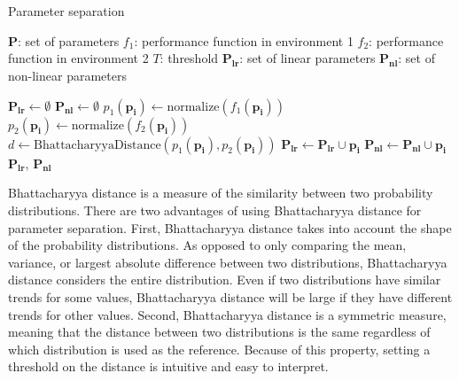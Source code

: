 \begin{algorithm}\small
  \caption{Parameter separation}
  \label{alg:separation}
  \begin{algorithmic}[1]
      \Require 
        \Statex $\boldsymbol{P}$: set of parameters
        \Statex $f_{1}$: performance function in environment 1
        \Statex $f_{2}$: performance function in environment 2
        \Statex $T$: threshold
      \Ensure 
        \Statex $\boldsymbol{P_{lr}}$: set of linear parameters
        \Statex $\boldsymbol{P_{nl}}$: set of non-linear parameters
      \Statex

      \State $\boldsymbol{P_{lr}} \gets \emptyset$
      \State $\boldsymbol{P_{nl}} \gets \emptyset$
          \State $p_{1}(\boldsymbol{p_i}) \gets \text{normalize}(f_{1}(\boldsymbol{p_i}))$\label{alg:separation:norm1}
          \State $p_{2}(\boldsymbol{p_i}) \gets \text{normalize}(f_{2}(\boldsymbol{p_i}))$\label{alg:separation:norm2}
          \State $d \gets \text{BhattacharyyaDistance}(p_{1}(\boldsymbol{p_i}), p_{2}(\boldsymbol{p_i}))$\label{alg:separation:distance}
          \label{alg:separation:threshold}
              \State $\boldsymbol{P_{lr}} \gets \boldsymbol{P_{lr}} \cup \boldsymbol{p_i}$
          \Else
              \State $\boldsymbol{P_{nl}} \gets \boldsymbol{P_{nl}} \cup \boldsymbol{p_i}$
          \EndIf
      \EndFor
      \State \Return $\boldsymbol{P_{lr}}$, $\boldsymbol{P_{nl}}$
  \end{algorithmic}
\end{algorithm}

Bhattacharyya distance is a measure of the similarity between two probability distributions.
There are two advantages of using Bhattacharyya distance for parameter separation.
First, Bhattacharyya distance takes into account the shape of the probability distributions.
As opposed to only comparing the mean, variance, or largest absolute difference between two distributions\cite{kstest}, Bhattacharyya distance considers the entire distribution.
Even if two distributions have similar trends for some values, Bhattacharyya distance will be large if they have different trends for other values.
Second, Bhattacharyya distance is a symmetric measure, meaning that the distance between two distributions is the same regardless of which distribution is used as the reference.
Because of this property, setting a threshold on the distance is intuitive and easy to interpret.

